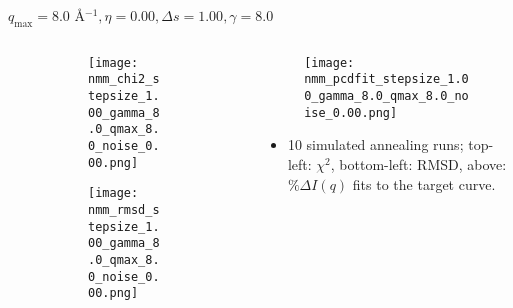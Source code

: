 \documentclass{beamer}
\begin{document}
\begin{frame}{$ q_{\textrm{max}}=8.0 $ \AA $^{-1}, \eta=0.00, \Delta s=1.00, \gamma=8.0$}
	\begin{columns}
		\begin{column}{.5\textwidth}
			\begin{figure}[H]
			\centering
			\begin{subfigure}[b]{\textwidth}
				\centering
				\texttt{[image: nmm\_chi2\_stepsize\_1.00\_gamma\_8.0\_qmax\_8.0\_noise\_0.00.png]}
				\label{fig:}
			\end{subfigure}
			\begin{subfigure}[b]{\textwidth}
				\centering
				\texttt{[image: nmm\_rmsd\_stepsize\_1.00\_gamma\_8.0\_qmax\_8.0\_noise\_0.00.png]}
				\label{fig:}
			\end{subfigure}
			\end{figure}
		\end{column}
		\begin{column}{.5\textwidth}
			\begin{figure}[H]
				\centering
				\texttt{[image: nmm\_pcdfit\_stepsize\_1.00\_gamma\_8.0\_qmax\_8.0\_noise\_0.00.png]}
				\label{fig:}
			\end{figure}
			\begin{itemize}
				\item 10 simulated annealing runs; top-left: $\chi^2$, bottom-left: RMSD, above: $\%\Delta I(q)$ fits to the target curve.
			\end{itemize}
		\end{column}
	\end{columns}
\end{frame}
 
\end{document}
